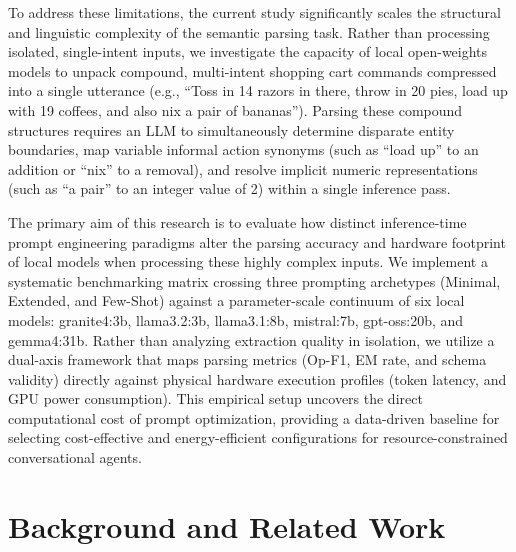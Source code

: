 \documentclass[journal,article,submit,pdftex,moreauthors]{Definitions/mdpi}
\begin{document}
To address these limitations, the current study significantly scales the structural and linguistic complexity of the semantic parsing task. Rather than processing isolated, single-intent inputs, we investigate the capacity of local open-weights models to unpack compound, multi-intent shopping cart commands compressed into a single utterance (e.g., ``Toss in 14 razors in there, throw in 20 pies, load up with 19 coffees, and also nix a pair of bananas''). Parsing these compound structures requires an LLM to simultaneously determine disparate entity boundaries, map variable informal action synonyms (such as ``load up'' to an addition or ``nix'' to a removal), and resolve implicit numeric representations (such as ``a pair'' to an integer value of 2) within a single inference pass.

The primary aim of this research is to evaluate how distinct inference-time prompt engineering paradigms alter the parsing accuracy and hardware footprint of local models when processing these highly complex inputs. We implement a systematic benchmarking matrix crossing three prompting archetypes (Minimal, Extended, and Few-Shot) against a parameter-scale continuum of six local models: granite4:3b, llama3.2:3b, llama3.1:8b, mistral:7b, gpt-oss:20b, and gemma4:31b. Rather than analyzing extraction quality in isolation, we utilize a dual-axis framework that maps parsing metrics (Op-F1, EM rate, and schema validity) directly against physical hardware execution profiles (token latency, and GPU power consumption). This empirical setup uncovers the direct computational cost of prompt optimization, providing a data-driven baseline for selecting cost-effective and energy-efficient configurations for resource-constrained conversational agents.

\section{Background and Related Work}
\end{document}
